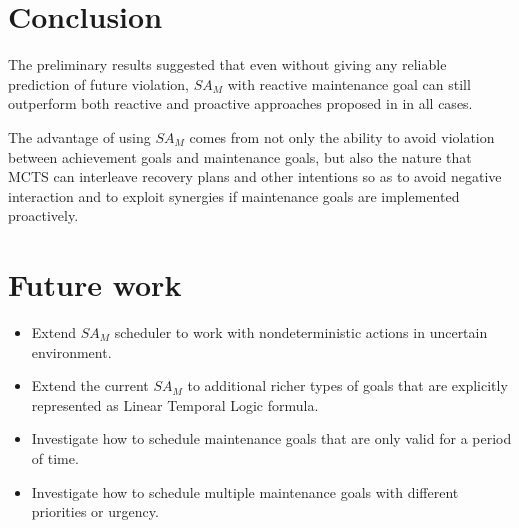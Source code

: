 \documentclass[a0,landscape]{a0poster}
\newcommand{\SAM}{\emph{$SA_M$}\xspace}
\begin{document}
\begin{multicols}{4}

\color{SaddleBrown} %


\color{DarkSlateGray} %


\section*{Conclusion}
The preliminary results suggested that even without giving any reliable prediction of future violation, \SAM with reactive maintenance goal can still outperform both reactive and proactive approaches proposed in \cite{DuffHT06} in all cases.

The advantage of using \SAM comes from not only the ability to avoid violation between achievement goals and maintenance goals, but also the nature that MCTS can interleave recovery plans and other intentions so as to avoid negative interaction and to exploit synergies 
if maintenance goals are implemented proactively.

\section*{Future work}
\begin{itemize}
    \item Extend \SAM scheduler to work with nondeterministic actions in uncertain environment.
    \item Extend the current \SAM to additional richer types of goals that are explicitly represented as Linear Temporal Logic formula.
    \item Investigate how to schedule maintenance goals that are only valid for a period of time.
    \item Investigate how to schedule multiple maintenance goals with different priorities or urgency.
\end{itemize}


\end{multicols}
\end{document}
